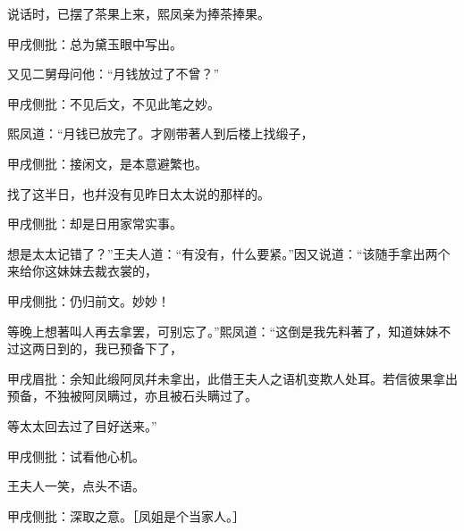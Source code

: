\begin{parag}
    说话时，已摆了茶果上来，熙凤亲为捧茶捧果。\begin{note}甲戌侧批：总为黛玉眼中写出。\end{note}又见二舅母问他：“月钱放过了不曾？”\begin{note}甲戌侧批：不见后文，不见此笔之妙。\end{note}熙凤道：“月钱已放完了。才刚带著人到后楼上找缎子，\begin{note}甲戌侧批：接闲文，是本意避繁也。\end{note}找了这半日，也幷没有见昨日太太说的那样的。\begin{note}甲戌侧批：却是日用家常实事。\end{note}想是太太记错了？”王夫人道：“有没有，什么要紧。”因又说道：“该随手拿出两个来给你这妹妹去裁衣裳的，\begin{note}甲戌侧批：仍归前文。妙妙！\end{note}等晚上想著叫人再去拿罢，可别忘了。”熙凤道：“这倒是我先料著了，知道妹妹不过这两日到的，我已预备下了，\begin{note}甲戌眉批：余知此缎阿凤幷未拿出，此借王夫人之语机变欺人处耳。若信彼果拿出预备，不独被阿凤瞒过，亦且被石头瞒过了。\end{note}等太太回去过了目好送来。”\begin{note}甲戌侧批：试看他心机。\end{note}王夫人一笑，点头不语。\begin{note}甲戌侧批：深取之意。［凤姐是个当家人。］\end{note}
\end{parag}


